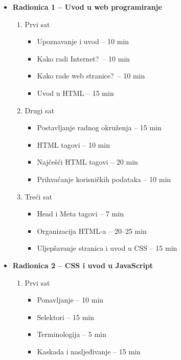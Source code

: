 \begin{itemize}
    \item \textbf{Radionica 1 -- Uvod u web programiranje}
        \begin{enumerate}
            \item Prvi sat
                \begin{itemize}
                    \item Upoznavanje i uvod -- 10 min
                    \item Kako radi Internet?\ -- 10 min
                    \item Kako rade web stranice?\ -- 10 min
                    \item Uvod u HTML -- 15 min
                \end{itemize}
            \item Drugi sat
                \begin{itemize}
                    \item Postavljanje radnog okruženja -- 15 min
                    \item HTML tagovi -- 10 min
                    \item Najčešći HTML tagovi -- 20 min
                    \item Prihvaćanje korisničkih podataka -- 10 min
                \end{itemize}
            \item Treći sat
                \begin{itemize}
                    \item Head i Meta tagovi -- 7 min
                    \item Organizacija HTML-a -- 20--25 min
                    \item Uljepšavanje stranica i uvod u CSS -- 15 min
                \end{itemize}
        \end{enumerate}
    \item \textbf{Radionica 2 -- CSS i uvod u JavaScript}
        \begin{enumerate}
            \item Prvi sat
                \begin{itemize}
                    \item Ponavljanje -- 10 min
                    \item Selektori -- 15 min
                    \item Terminologija -- 5 min
                    \item Kaskada i nasljeđivanje -- 15 min

\end{itemize}
\end{enumerate}
\end{itemize}
